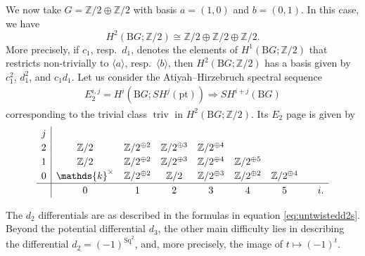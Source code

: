 \documentclass[10pt,a4paper]{amsart}
\numberwithin{equation}{section}
\begin{document}
\begin{Example}\label{ex:FSF2CZ2Z2}
We now take $G=\mathbb{Z}/2\oplus\mathbb{Z}/2$ with basis $a=(1,0)$ and $b=(0,1)$. In this case, we have
\[
H^2(\mathrm{B}G;\mathbb{Z}/2)\cong\mathbb{Z}/2\oplus\mathbb{Z}/2\oplus\mathbb{Z}/2.
\]
More precisely, if $c_1$, resp.\ $d_1$, denotes the elements of $H^1(\mathrm{B}G;\mathbb{Z}/2)$ that restricts non-trivially to $\langle a\rangle$, resp.\ $\langle b\rangle$, then $H^2(\mathrm{B}G;\mathbb{Z}/2)$ has a basis given by $c_1^2$, $d_1^2$, and $c_1d_1$. Let us consider the Atiyah--Hirzebruch spectral sequence
\begin{gather*}
E_2^{i,j}=H^i(\mathrm{B}G;SH^j(\mathrm{pt}))\Rightarrow SH^{i+j}(\mathrm{B}G)
\end{gather*}
corresponding to the trivial class $\operatorname{triv}$ in $H^2(\mathrm{B}G;\mathbb{Z}/2)$. Its $E_2$ page is given by
\begin{gather*}\renewcommand{\arraystretch}{1.2}\begin{array}{c|ccccccc}
 j \\
 2 & \mathbb{Z}/2 & \mathbb{Z}/2^{\oplus 2} & \mathbb{Z}/2^{\oplus 3} & \mathbb{Z}/2^{\oplus 4} \\
 1 & \mathbb{Z}/2 & \mathbb{Z}/2^{\oplus 2} & \mathbb{Z}/2^{\oplus 3} & \mathbb{Z}/2^{\oplus 4} & \mathbb{Z}/2^{\oplus 5}\\
 0 & \mathds{k}^{\times}& \mathbb{Z}/2^{\oplus 2} & \mathbb{Z}/2 & \mathbb{Z}/2^{\oplus 3} & \mathbb{Z}/2^{\oplus 2} & \mathbb{Z}/2^{\oplus 4} \\
 \hline
 & 0 & 1 & 2 & 3 & 4 & 5 & \quad i.
\end{array}\end{gather*}

The $d_2$ differentials are as described in the formulas in equation \eqref{eq:untwistedd2s}. Beyond the potential differential $d_3$, the other main difficulty lies in describing the differential $d_2=(-1)^{\mathrm{Sq}^2}$, and, more precisely, the image of $t\mapsto (-1)^{t}$.


\end{Example}
\end{document}
